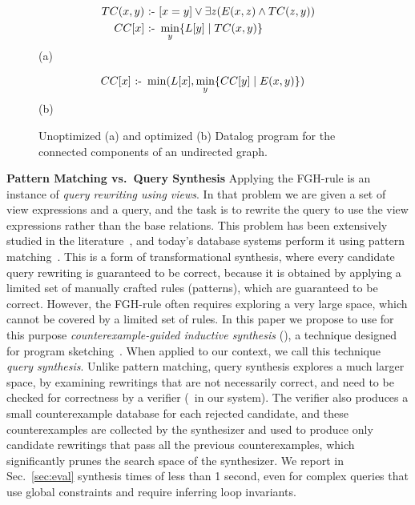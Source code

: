\begin{figure}
  \centering
\begin{align*}
  TC(x,y) \text{ :- } &  [x=y] \vee \exists z(E(x,z) \wedge TC(z,y)) \\
  CC[x] \text{ :- } & \min_y \{{L[y]}\mid{TC(x,y)}\}
\end{align*}
\null\hfill(a)\hfill\null

\begin{align*}
  CC[x] \text{ :- } & \min(L[x], \min_y \{{CC[y]}\mid{E(x,y)}\})
\end{align*}
\null\hfill(b)\hfill\null

\caption{Unoptimized (a) and optimized (b) Datalog program for the connected components of an undirected graph.}
  \label{fig:cc}
\end{figure}


{\bf Pattern Matching vs.\ Query Synthesis} Applying the FGH-rule is
an instance of {\em query rewriting using views}.  In that problem we
are given a set of view expressions and a query, and the task is to
rewrite the query to use the view expressions rather than the base
relations. This problem has been extensively studied in the
literature~\cite{DBLP:journals/vldb/Halevy01}, and today's database
systems perform it using pattern
matching~\cite{DBLP:conf/sigmod/GoldsteinL01}.  This is a form of
transformational synthesis, where every candidate query rewriting is
guaranteed to be correct, because it is obtained by applying a limited
set of manually crafted rules (patterns), which are guaranteed to be
correct.  However, the FGH-rule often requires exploring a very large
space, which cannot be covered by a limited set of rules.  In this
paper we propose to use for this purpose {\em counterexample-guided inductive
  synthesis} (\cegis), a technique designed
for program
sketching~\cite{DBLP:conf/asplos/Solar-LezamaTBSS06,DBLP:conf/tacas/TorlakJ07}.
When applied to our context, we call this technique {\em query
  synthesis}.  Unlike pattern matching, query synthesis explores a
much larger space, by examining rewritings that are not necessarily
correct, and need to be checked for correctness by a verifier (\zzz\ in
our system).
The verifier also produces a small counterexample
database for each rejected candidate, and these counterexamples are
collected by the synthesizer and used to produce only candidate
rewritings that pass all the previous counterexamples, which
significantly prunes the search space of the synthesizer.  We report
in Sec.~\ref{sec:eval} synthesis times of less than 1 second, even for
complex queries that use global constraints and require inferring loop
invariants.

